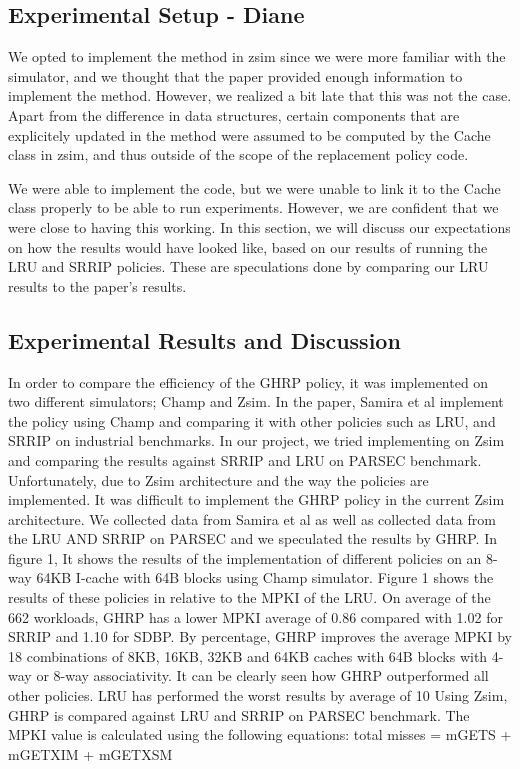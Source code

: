 \documentclass[11pt]{article}
\begin{document}
\subsection{Experimental Setup - Diane}
We opted to implement the method in zsim since we were more familiar with the simulator, and we thought that the paper provided enough information to implement the method.
However, we realized a bit late that this was not the case. Apart from the difference in data structures, certain components that are explicitely updated in the method were assumed
to be computed by the Cache class in zsim, and thus outside of the scope of the replacement policy code.\par
We were able to implement the code, but we were unable to link it to the Cache class properly to be able to run experiments. However, we are confident that we were close to having this working.
In this section, we will discuss our expectations on how the results would have looked like, based on our results of running the LRU and SRRIP policies.
These are speculations done by comparing our LRU results to the paper's results.

\subsection{Experimental Results and Discussion}
In order to compare the efficiency of the GHRP policy, it was implemented on two different simulators; Champ and Zsim. In the paper, Samira et al implement the policy using
Champ and comparing it with other policies such as LRU, and SRRIP on industrial benchmarks. In our project, we tried implementing on Zsim and comparing the results against 
SRRIP and LRU on PARSEC benchmark. Unfortunately, due to Zsim architecture and the way the policies are implemented. It was difficult to implement the GHRP policy in the 
current Zsim architecture. We collected data from Samira et al as well as collected data from the  LRU AND SRRIP on PARSEC and we speculated the results by GHRP. In figure 1,
It shows the results of the implementation of different policies on an 8-way 64KB I-cache with 64B blocks using Champ simulator. Figure 1 shows the results of these policies in
relative to the MPKI of the LRU. On average of the 662 workloads, GHRP has a lower MPKI average of 0.86 compared with 1.02 for SRRIP and 1.10 for SDBP. By percentage, GHRP 
improves the average MPKI by 18%
combinations of 8KB,  16KB, 32KB and 64KB caches with 64B blocks with 4-way or 8-way associativity. It can be clearly seen how GHRP outperformed all other policies. LRU has
performed the worst results by average of 10%
Using Zsim, GHRP is compared against LRU and SRRIP on PARSEC benchmark. The MPKI value is calculated using the following equations:  
total misses = mGETS + mGETXIM + mGETXSM
\end{document}
